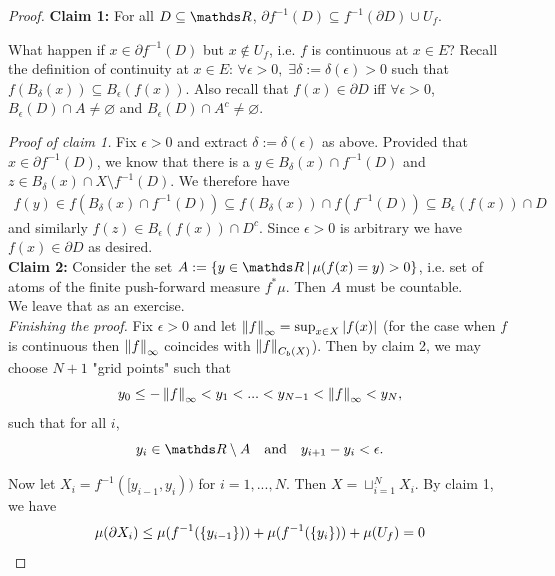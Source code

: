\begin{proof}
\textbf{Claim 1:} For all $D \subseteq \R$, $\partial f^{-1}(D) \subseteq f^{-1}(\partial D) \cup U_f$.

\begin{hint}
What happen if $x \in \partial f^{-1}(D)$ but $x \notin U_f$, i.e. $f$ is continuous at $x \in E$? Recall the definition of continuity at $x \in E$: $\forall \epsilon > 0,\; \exists \delta := \delta(\epsilon) > 0$ such that $f(B_\delta(x)) \subseteq B_\epsilon(f(x))$. Also recall that $f(x) \in \partial D$ iff $\forall \epsilon > 0$, $B_\epsilon(D) \cap A \neq \varnothing$ and $B_\epsilon(D) \cap A^c \neq \varnothing$.
\end{hint}

\textit{Proof of claim 1.} Fix $\epsilon>0$ and extract $\delta := \delta(\epsilon)$ as above. Provided that $x \in \partial f^{-1}(D)$, we know that there is a $y \in B_\delta(x) \cap f^{-1}(D)$ and $z \in B_\delta(x) \cap X\setminus f^{-1}(D)$. We therefore have
\begin{align*}
    f(y) \in f(B_\delta(x) \cap f^{-1}(D)) \subseteq f(B_\delta(x)) \cap f(f^{-1}(D)) \subseteq B_\epsilon(f(x)) \cap D 
\end{align*}
and similarly $f(z) \in B_\epsilon(f(x)) \cap D^c$. Since $\epsilon > 0$ is arbitrary we have $f(x) \in \partial D$ as desired. \\

\textbf{Claim 2:} Consider the set $A := \set{y \in \R \,|\, \mu(f(x) = y) > 0}$, i.e. set of atoms of the finite push-forward measure $f^*\mu$. Then $A$ must be countable.\\

We leave that as an exercise.\\

\textit{Finishing the proof.} Fix $\epsilon > 0$ and let $\left\| f \right\|_\infty = \sup_{x\in X} |f(x)|$ (for the case when $f$ is continuous then $\left\| f \right\|_\infty$ coincides with $\left\| f \right\|_{C_b(X)}$).  Then by claim 2, we may choose $N+1$ "grid points" such that 
\begin{equation*}
    y_0 \leq -\left\| f \right\|_\infty < y_1 < ... < y_{N-1} < \left\| f \right\|_\infty < y_N,
\end{equation*}
such that for all $i$,
\begin{equation*}
    y_i \in \R \setminus A \quad \text{and} \quad y_{i+1} - y_i < \epsilon.
\end{equation*}

Now let $X_i = f^{-1}([y_{i-1}, y_i))$ for $i=1,...,N$. Then $X = \sqcup_{i=1}^N X_i$. By claim 1, we have
\begin{equation*}
    \mu(\partial X_i) \leq \mu(f^{-1}(\left\{ y_{i-1} \right \})) + \mu(f^{-1}(\left\{ y_{i} \right \})) + \mu(U_f) = 0
\end{equation*}


\end{proof}
